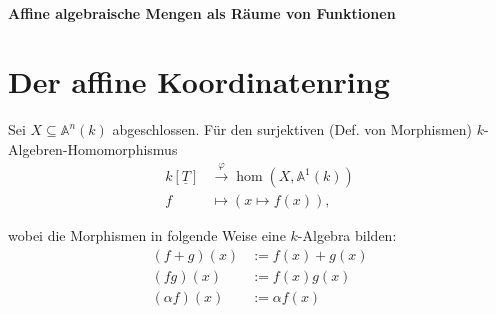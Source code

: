 
\paragraph*{Affine algebraische Mengen als Räume von Funktionen}

\section{Der affine Koordinatenring}
\label{sec:koordinatenring}

Sei $X\subseteq\mathbb{A}^{n}(k)$ abgeschlossen. Für den surjektiven
(Def. von Morphismen) $k$-Algebren-Homomorphismus
\begin{align*}
  k[\underline{T}] & \xrightarrow{\varphi}\hom(X,\mathbb{A}^{1}(k))\\
  f & \mapsto(x\mapsto f(x)),
\end{align*}

wobei die Morphismen in folgende Weise eine $k$-Algebra bilden:
\begin{align*}
  (f+g)(x) & :=f(x)+g(x)\\
  (fg)(x) & :=f(x)g(x)\\
  (\alpha f)(x) & :=\alpha f(x)
\end{align*}

